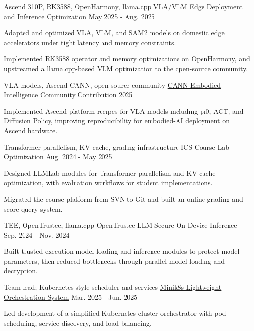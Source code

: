 \documentclass[10pt, a4paper]{awesome-cv}
\begin{document}
\begin{cventries}
  \cventry
    {Ascend 310P, RK3588, OpenHarmony, llama.cpp}
    {VLA/VLM Edge Deployment and Inference Optimization}
    {}
    {May 2025 - Aug. 2025}
    {
      \begin{cvitems}
        \item {Adapted and optimized VLA, VLM, and SAM2 models on domestic edge accelerators under tight latency and memory constraints.}
        \item {Implemented RK3588 operator and memory optimizations on OpenHarmony, and upstreamed a llama.cpp-based VLM optimization to the open-source community.}
      \end{cvitems}
    }

  \cventry
    {VLA models, Ascend CANN, open-source community}
    {\href{https://gitcode.com/cann/cann-recipes-embodied-intelligence}{CANN Embodied Intelligence Community Contribution}}
    {}
    {2025}
    {
      \begin{cvitems}
        \item {Implemented Ascend platform recipes for VLA models including pi0, ACT, and Diffusion Policy, improving reproducibility for embodied-AI deployment on Ascend hardware.}
      \end{cvitems}
    }

  \cventry
    {Transformer parallelism, KV cache, grading infrastructure}
    {ICS Course Lab Optimization}
    {}
    {Aug. 2024 - May 2025}
    {
      \begin{cvitems}
        \item {Designed LLMLab modules for Transformer parallelism and KV-cache optimization, with evaluation workflows for student implementations.}
        \item {Migrated the course platform from SVN to Git and built an online grading and score-query system.}
      \end{cvitems}
    }

  \cventry
    {TEE, OpenTrustee, llama.cpp}
    {OpenTrustee LLM Secure On-Device Inference}
    {}
    {Sep. 2024 - Nov. 2024}
    {
      \begin{cvitems}
        \item {Built trusted-execution model loading and inference modules to protect model parameters, then reduced bottlenecks through parallel model loading and decryption.}
      \end{cvitems}
    }

  \cventry
    {Team lead; Kubernetes-style scheduler and services}
    {\href{https://github.com/kiwi142857/Minik8s}{Minik8s Lightweight Orchestration System}}
    {}
    {Mar. 2025 - Jun. 2025}
    {
      \begin{cvitems}
        \item {Led development of a simplified Kubernetes cluster orchestrator with pod scheduling, service discovery, and load balancing.}
      \end{cvitems}
    }
\end{cventries}
\end{document}
